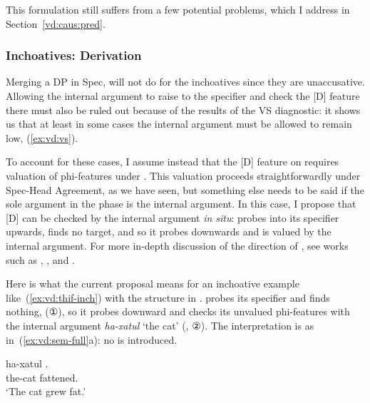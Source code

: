 \begin{exe}
\begin{xlist}
\begin{xlist}
\begin{exe}
\begin{exe}
\begin{xlist}
\begin{exe}
\begin{xlist}
\begin{exe}
\begin{xlist}
\begin{xlist}
\begin{exe}
\begin{xlist}
\begin{exe}
\begin{xlist}
\begin{exe}
\begin{xlist}
\begin{exe}
\begin{exe}
\begin{exe}
\begin{xlist}
\begin{exe}
\begin{exe}
\begin{xlist}
\begin{xlist}
\begin{exe}
\begin{xlist}
This formulation still suffers from a few potential problems, which I address in Section~\ref{vd:caus:pred}.

		\subsubsection{Inchoatives: Derivation}
Merging a DP in Spec,{\vd} will not do for the inchoatives since they are unaccusative. Allowing the internal argument to raise to the specifier and check the [D] feature there must also be ruled out because of the results of the VS diagnostic: it shows us that at least in some cases the internal argument must be allowed to remain low, (\ref{ex:vd:vs}).

To account for these cases, I assume instead that the [D] feature on {\vd} requires valuation of phi-features under  \citep{nie17,schaefer17oup}. This valuation proceeds straightforwardly under Spec-Head Agreement, as we have seen, but something else needs to be said if the sole argument in the phase is the internal argument. In this case, I propose that [D] can be checked by the internal argument \emph{in situ}: {\vd} probes into its specifier upwards, finds no target, and so it probes downwards and is valued by the internal argument. For more in-depth discussion of the direction of , see works such as \cite{bejarrezac09}, \cite{zeijlstra12}, \cite{preminger13tlr} and \cite{deal15nels}.

Here is what the current proposal means for an inchoative example like~(\ref{ex:vd:thif-inch}) with the structure in . {\vd} probes its specifier and finds nothing,  (①), so it probes downward and checks its unvalued phi-features with the internal argument \emph{ha-xatul} `the cat' (, ②). The interpretation is as in~(\ref{ex:vd:sem-full}a): no  is introduced.

 \begin{exe}
\ex \label{ex:vd:thif-inch}  
	{ \gll ha-xatul .\\
 	  the-cat fattened.\\
 	\glt `The cat grew fat.' } 
	
 \z 
	

\end{exe}
\end{xlist}
\end{exe}
\end{xlist}
\end{xlist}
\end{exe}
\end{exe}
\end{xlist}
\end{exe}
\end{exe}
\end{exe}
\end{xlist}
\end{exe}
\end{xlist}
\end{exe}
\end{xlist}
\end{exe}
\end{xlist}
\end{xlist}
\end{exe}
\end{xlist}
\end{exe}
\end{xlist}
\end{exe}
\end{exe}
\end{xlist}
\end{xlist}
\end{exe}
